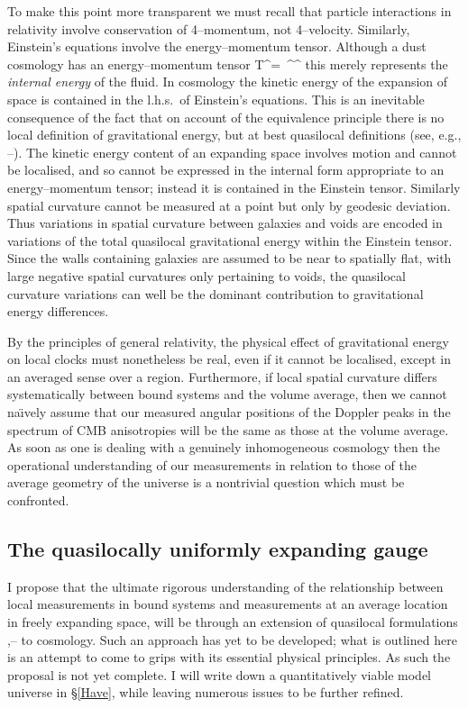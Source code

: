\documentclass[12pt]{iopart}
\begin{document}
To make this point more transparent we must recall that particle interactions
in relativity involve conservation of 4--momentum, not 4--velocity. Similarly,
Einstein's equations involve the energy--momentum tensor.
Although a dust cosmology has an energy--momentum tensor
\beq T^{\mu\nu}=\rh\, \bn^\mu\bn^\nu\label{stress}\eeq
this merely represents the {\em internal energy} of the fluid. In cosmology
the kinetic energy of the expansion of space is contained in the l.h.s.\ of
Einstein's equations. This is an inevitable consequence of the fact that on
account of the equivalence principle there is no local definition of
gravitational energy, but at best quasilocal definitions (see, e.g.,
\cite{quasi_rev}--\cite{quasi2}). The kinetic energy content of an expanding
space involves motion and cannot be localised, and so cannot be expressed
in the internal form appropriate to an energy--momentum tensor; instead it
is contained in the Einstein tensor. Similarly spatial curvature cannot
be measured at a point but only by geodesic deviation. Thus variations in
spatial curvature between galaxies and voids are encoded in variations
of the total quasilocal gravitational energy within the Einstein tensor.
Since the walls containing galaxies are assumed to be near
to spatially flat, with large negative spatial curvatures only pertaining to
voids, the quasilocal curvature variations can well be the dominant
contribution to gravitational energy differences.

By the principles of general relativity, the physical effect of gravitational
energy on local clocks must nonetheless be real, even if it cannot be
localised, except in an averaged sense over a region. Furthermore, if
local spatial curvature differs systematically between bound systems and
the volume average, then we cannot na\"{\i}vely assume that our measured
angular positions of the Doppler peaks in the spectrum of CMB anisotropies
will be the same as those at the volume average. As soon as one
is dealing with a genuinely inhomogeneous cosmology then the operational
understanding of our measurements in relation to those of the average
geometry of the universe is a nontrivial question which must be confronted.

\subsection{The quasilocally uniformly expanding gauge\label{quasiexp}}

I propose that the ultimate rigorous understanding of the relationship
between local measurements in bound systems and measurements at an average
location in freely expanding space, will be through an extension of quasilocal
formulations \cite{KLB},\cite{quasi_rev}--\cite{quasi2} to cosmology. Such an
approach has yet to be developed; what is outlined here is an attempt
to come to grips with its essential physical principles. As such the
proposal is not yet complete. I will write down a quantitatively viable model
universe in \S\ref{Have}, while leaving numerous issues to be further
refined.
\end{document}
